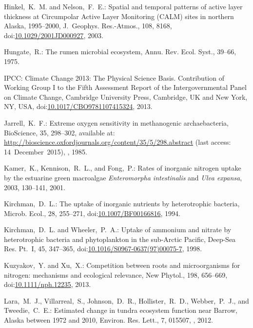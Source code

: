 \documentclass[gmdd, online, hvmath]{copernicus}
\begin{document}
\begin{thebibliography}{55}
Hinkel,~K.~M. and Nelson,~F.~E.:
Spatial and temporal patterns of active layer thickness at Circumpolar Active Layer Monitoring (CALM) sites in northern Alaska, 1995--2000,
J.~Geophys. Res.-Atmos.,
108, 8168,
doi:\href{http://dx.doi.org/10.1029/2001JD000927}{10.1029/2001JD000927}, 2003.


Hungate,~R.:
The rumen microbial ecosystem,
Annu. Rev. Ecol. Syst.,
39--66, 1975.


IPCC:
Climate Change 2013: The Physical Science Basis. Contribution of Working Group I to the Fifth Assessment Report of the Intergovernmental Panel on Climate Change,
Cambridge University Press, Cambridge, UK and New York, NY, USA,
doi:\href{http://dx.doi.org/10.1017/CBO9781107415324}{10.1017/CBO9781107415324}, 2013.


Jarrell,~K.~F.:
Extreme oxygen sensitivity in methanogenic archaebacteria,
BioScience,
35, 298--302,
available at: \url{http://bioscience.oxfordjournals.org/content/35/5/298.abstract} (last access: 14~December~2015), , 1985.

Kamer,~K., Kennison,~R.~L., and Fong,~P.:
Rates of inorganic nitrogen uptake by the estuarine green macroalgae \textit{Enteromorpha intestinalis} and \textit{Ulva expansa},
2003, 130--141, 2001.


Kirchman,~D.~L.:
The uptake of inorganic nutrients by heterotrophic bacteria,
Microb. Ecol.,
28, 255--271,
doi:\href{http://dx.doi.org/10.1007/BF00166816}{10.1007/BF00166816}, 1994.


Kirchman,~D.~L. and Wheeler,~P.~A.:
Uptake of ammonium and nitrate by heterotrophic bacteria and phytoplankton in the sub-Arctic Pacific,
Deep-Sea Res. Pt.~I,
45, 347--365,
doi:\href{http://dx.doi.org/10.1016/S0967-0637(97)00075-7}{10.1016/S0967-0637(97)00075-7}, 1998.


Kuzyakov,~Y. and Xu,~X.:
Competition between roots and microorganisms for nitrogen: mechanisms and ecological relevance,
New Phytol.,
198, 656--669,
doi:\href{http://dx.doi.org/10.1111/nph.12235}{10.1111/nph.12235}, 2013.


Lara,~M.~J., Villarreal,~S., Johnson,~D.~R., Hollister,~R.~D., Webber,~P.~J., and Tweedie,~C.~E.:
Estimated change in tundra ecosystem function near Barrow, Alaska between 1972 and 2010,
Environ. Res. Lett.,
7, 015507, , 2012.



\end{thebibliography}
\end{document}
